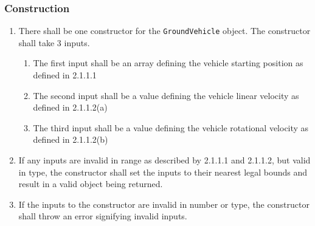 \documentclass{article}
\begin{document}
\subsubsection{Construction}
\begin{enumerate}
	\item There shall be one constructor for the \verb|GroundVehicle| object.  The constructor shall take 3 inputs.
	\begin{enumerate}
		\item The first input shall be an array defining the vehicle starting position as defined in 2.1.1.1
		\item The second input shall be a value defining the vehicle linear velocity as defined in 2.1.1.2(a)
		\item The third input shall be a value defining the vehicle rotational velocity as defined in 2.1.1.2(b)
	\end{enumerate}
	\item If any inputs are invalid in range as described by 2.1.1.1 and 2.1.1.2, but valid in type, the constructor shall set the inputs to their nearest legal bounds and result in a valid object being returned.
	\item If the inputs to the constructor are invalid in number or type, the constructor shall throw an error signifying invalid inputs.
\end{enumerate}
\end{document}

